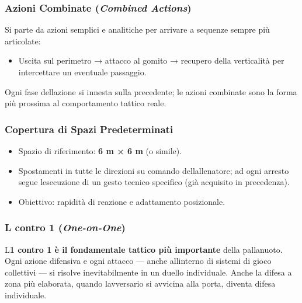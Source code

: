 \documentclass[a4paper,11pt]{article}
\providecommand{\tightlist}{%
  \setlength{\itemsep}{0pt}\setlength{\parskip}{0pt}}
\begin{document}
\subsubsection{\texorpdfstring{Azioni Combinate (\emph{Combined
                  Actions})}{Azioni Combinate (Combined Actions)}}\label{azioni-combinate-combined-actions}

Si parte da azioni semplici e analitiche per arrivare a sequenze sempre
più articolate:

\begin{itemize}
      \tightlist
      \item
            Uscita sul perimetro → attacco al gomito → recupero della verticalità
            per intercettare un eventuale passaggio.
\end{itemize}

Ogni fase dell\textquotesingle azione si innesta sulla precedente; le
azioni combinate sono la forma più prossima al comportamento tattico
reale.

\subsubsection{Copertura di Spazi
      Predeterminati}\label{copertura-di-spazi-predeterminati}

\begin{itemize}
      \tightlist
      \item
            Spazio di riferimento: \textbf{6 m × 6 m} (o simile).
      \item
            Spostamenti in tutte le direzioni su comando
            dell\textquotesingle allenatore; ad ogni arresto segue
            l\textquotesingle esecuzione di un gesto tecnico specifico (già
            acquisito in precedenza).
      \item
            Obiettivo: rapidità di reazione e adattamento posizionale.
\end{itemize}

\subsubsection{\texorpdfstring{L contro 1
            (\emph{One-on-One})}{L contro 1 (One-on-One)}}\label{l1-contro-1-one-on-one}

L\textquotesingle{}\textbf{1 contro 1 è il fondamentale tattico più
      importante} della pallanuoto. Ogni azione difensiva e ogni attacco ---
anche all\textquotesingle interno di sistemi di gioco collettivi --- si
risolve inevitabilmente in un duello individuale. Anche la difesa a zona
più elaborata, quando l\textquotesingle avversario si avvicina alla
porta, diventa difesa individuale.
\end{document}
